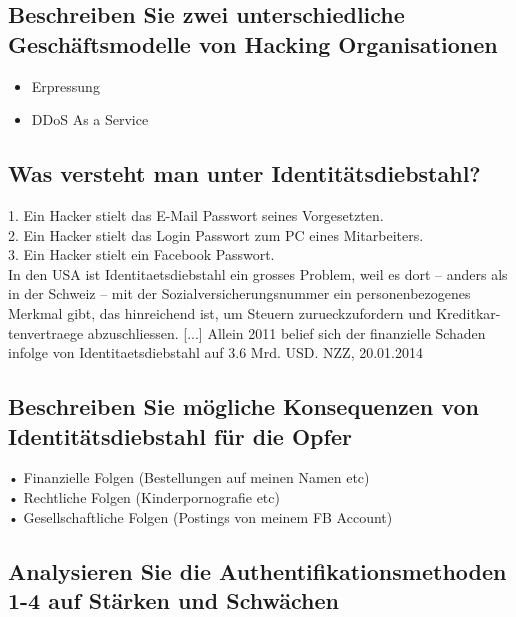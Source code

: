\documentclass[a4paper, 11pt, nofootinbib]{article}
\begin{document}
\subsection{Beschreiben Sie zwei unterschiedliche Geschäftsmodelle von Hacking Organisationen}
\begin{itemize}
	\item Erpressung
	\item DDoS As a Service
\end{itemize}

\subsection{Was versteht man unter Identitätsdiebstahl?}
1. Ein Hacker stielt das E-Mail Passwort seines Vorgesetzten.\\
2. Ein Hacker stielt das Login Passwort zum PC eines Mitarbeiters.\\
3. Ein Hacker stielt ein Facebook Passwort.\\

In den USA ist Identitaetsdiebstahl ein grosses Problem, weil es dort – anders
als in der Schweiz – mit der Sozialversicherungsnummer ein personenbezogenes
Merkmal gibt, das hinreichend ist, um Steuern zurueckzufordern und Kreditkar-
tenvertraege abzuschliessen. [...] Allein 2011 belief sich der finanzielle Schaden
infolge von Identitaetsdiebstahl auf 3.6 Mrd. USD. NZZ, 20.01.2014

\subsection{Beschreiben Sie mögliche Konsequenzen von Identitätsdiebstahl für die Opfer}
• Finanzielle Folgen (Bestellungen auf meinen Namen etc)\\
• Rechtliche Folgen (Kinderpornografie etc)\\
• Gesellschaftliche Folgen (Postings von meinem FB Account)\\

\newpage

\subsection{Analysieren Sie die Authentifikationsmethoden 1-4 auf Stärken und Schwächen}
\end{document}
